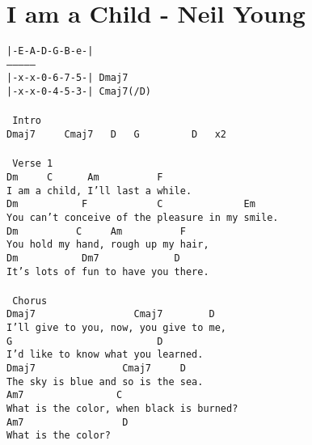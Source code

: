 \newpage
\section{I am a Child - Neil Young}
\label{I am a Child - Neil Young}
\texttt{|-E-A-D-G-B-e-|\\
---------------\\
|-x-x-0-6-7-5-|\ Dmaj7\\
|-x-x-0-4-5-3-|\ Cmaj7(/D)\\
\\
\lbrack\ Intro\rbrack\ \\
Dmaj7\ \ \ \ \ Cmaj7\ \ \ D\ \ \ G\ \ \ \ \ \ \ \ \ D \ \ x2\\
\\
\lbrack\ Verse\ 1\rbrack\ \\
Dm\ \ \ \ \ C\ \ \ \ \ \ Am\ \ \ \ \ \ \ \ \ \ F\ \\
I\ am\ a\ child,\ I'll\ last\ a\ while.\ \\
Dm\ \ \ \ \ \ \ \ \ \ \ F\ \ \ \ \ \ \ \ \ \ \ \ C\ \ \ \ \ \ \ \ \ \ \ \ \ \ Em\ \\
You\ can't\ conceive\ of\ the\ pleasure\ in\ my\ smile.\ \\
Dm\ \ \ \ \ \ \ \ \ \ C\ \ \ \ \ Am\ \ \ \ \ \ \ \ \ \ F\ \\
You\ hold\ my\ hand,\ rough\ up\ my\ hair,\ \\
Dm\ \ \ \ \ \ \ \ \ \ \ Dm7\ \ \ \ \ \ \ \ \ \ \ \ \ D\ \\
It's\ lots\ of\ fun\ to\ have\ you\ there.\ \\
\\
\lbrack\ Chorus\rbrack\ \\
Dmaj7\ \ \ \ \ \ \ \ \ \ \ \ \ \ \ \ \ Cmaj7\ \ \ \ \ \ \ \ D\ \\
I'll\ give\ to\ you,\ now,\ you\ give\ to\ me,\ \\
G\ \ \ \ \ \ \ \ \ \ \ \ \ \ \ \ \ \ \ \ \ \ \ \ \ D\ \\
I'd\ like\ to\ know\ what\ you\ learned.\ \\
Dmaj7\ \ \ \ \ \ \ \ \ \ \ \ \ \ \ Cmaj7\ \ \ \ \ D\ \\
The\ sky\ is\ blue\ and\ so\ is\ the\ sea.\ \\
Am7\ \ \ \ \ \ \ \ \ \ \ \ \ \ \ \ C\ \\
What\ is\ the\ color,\ when\ black\ is\ burned?\ \\
Am7\ \ \ \ \ \ \ \ \ \ \ \ \ \ \ \ \ D\ \\
What\ is\ the\ color?\ \\
\\
}
